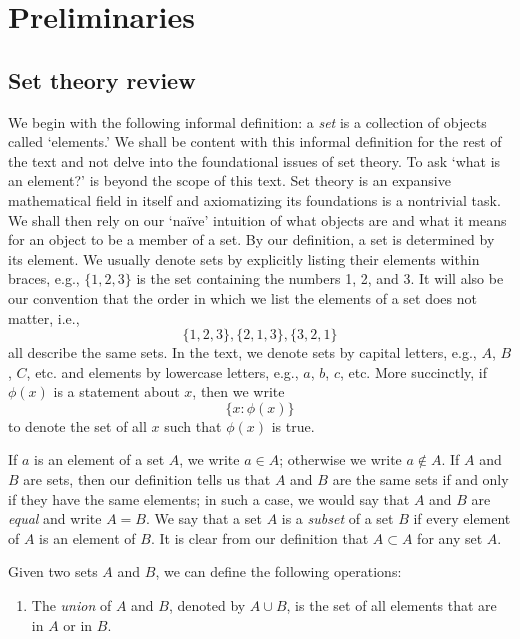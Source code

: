\chapter{Preliminaries}
\label{ch:preliminaries}

\section{Set theory review}
\label{sec:set-theory-review}

We begin with the following informal definition: a \emph{set} is a collection of
objects called `elements.' We shall be content with this informal definition for
the rest of the text and not delve into the foundational issues of set theory.
To ask `what is an element?' is beyond the scope of this text. Set theory is an
expansive mathematical field in itself and axiomatizing its foundations is a
nontrivial task. We shall then rely on our `na\"ive' intuition of what objects
are and what it means for an object to be a member of a set. By our definition,
a set is determined by its element. We usually denote sets by explicitly listing
their elements within braces, e.g., \(\{1, 2, 3\}\) is the set containing the
numbers 1, 2, and 3. It will also be our convention that the order in which we
list the elements of a set does not matter, i.e.,
\[
    \{1, 2, 3\}, \{2, 1, 3\}, \{3, 2, 1\}
\]
all describe the same sets. In the text, we denote sets by capital letters,
e.g., \(A\), \(B\), \(C\), etc. and elements by lowercase letters, e.g., \(a\),
\(b\), \(c\), etc. More succinctly, if \(\phi(x)\) is a statement about \(x\),
then we write
\[
    \{x : \phi(x)\}
\]
to denote the set of all \(x\) such that \(\phi(x)\) is true. 

If \(a\) is an element of a set \(A\), we write \(a \in A\); otherwise we write
\(a \notin A\). If \(A\) and \(B\) are sets, then our definition tells us that
\(A\) and \(B\) are the same sets if and only if they have the same elements; in
such a case, we would say that \(A\) and \(B\) are \emph{equal} and write \(A =
B\). We say that a set \(A\) is a \emph{subset} of a set \(B\) if every element
of \(A\) is an element of \(B\). It is clear from our definition that \(A
\subset A\) for any set \(A\).

Given two sets \(A\) and \(B\), we can define the following operations:
\begin{enumerate}[label=(\alph*), wide]
    \item The \emph{union} of \(A\) and \(B\), denoted by \(A \cup B\), is the set of all elements that are in \(A\) or in \(B\).
\end{enumerate}

